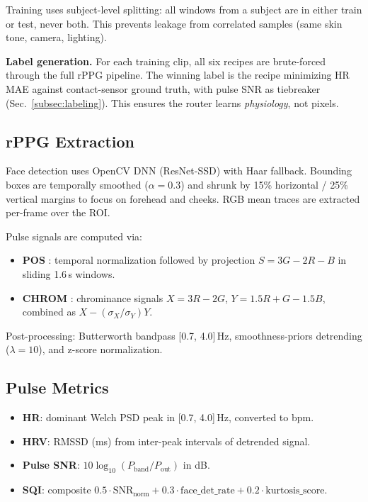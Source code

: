 \documentclass[conference]{IEEEtran}
\begin{document}
Training uses subject-level splitting: all windows from a subject are in either train or test, never both. This prevents leakage from correlated samples (same skin tone, camera, lighting).

\textbf{Label generation.} For each training clip, all six recipes are brute-forced through the full rPPG pipeline. The winning label is the recipe minimizing HR MAE against contact-sensor ground truth, with pulse SNR as tiebreaker (Sec.~\ref{subsec:labeling}). This ensures the router learns \emph{physiology}, not pixels.

\subsection{rPPG Extraction}
\label{subsec:rppg}

Face detection uses OpenCV DNN (ResNet-SSD) with Haar fallback. Bounding boxes are temporally smoothed ($\alpha = 0.3$) and shrunk by 15\% horizontal / 25\% vertical margins to focus on forehead and cheeks. RGB mean traces are extracted per-frame over the ROI.

Pulse signals are computed via:
\begin{itemize}
    \item \textbf{POS} \cite{wang2016algorithmic}: temporal normalization followed by projection $S = 3G - 2R - B$ in sliding 1.6\,s windows.
    \item \textbf{CHROM} \cite{de2013robust}: chrominance signals $X = 3R - 2G$, $Y = 1.5R + G - 1.5B$, combined as $X - (\sigma_X/\sigma_Y)Y$.
\end{itemize}

Post-processing: Butterworth bandpass [0.7, 4.0]\,Hz, smoothness-priors detrending ($\lambda = 10$), and z-score normalization.

\subsection{Pulse Metrics}
\label{subsec:metrics}

\begin{itemize}
    \item \textbf{HR}: dominant Welch PSD peak in [0.7, 4.0]\,Hz, converted to bpm.
    \item \textbf{HRV}: RMSSD (ms) from inter-peak intervals of detrended signal.
    \item \textbf{Pulse SNR}: $10\log_{10}(P_{\text{band}} / P_{\text{out}})$ in dB.
    \item \textbf{SQI}: composite $0.5 \cdot \text{SNR}_{\text{norm}} + 0.3 \cdot \text{face\_det\_rate} + 0.2 \cdot \text{kurtosis\_score}$.
\end{itemize}
\end{document}
